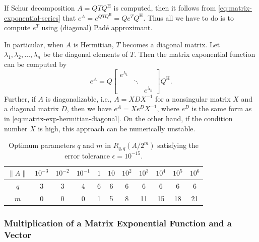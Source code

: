 {If Schur decomposition $A=QTQ^{\mathrm H}$ is computed, then it follows from \eqref{eq:matrix-exponential-series} that $e^A=e^{QTQ^{\mathrm H}}=Qe^TQ^{\mathrm H}$. Thus all we have to do is to compute $e^T$ using (diagonal) Padé approximant.}

{In particular, when $A$ is Hermitian, $T$ becomes a diagonal matrix. Let $\lambda_1,\lambda_2,\ldots,\lambda_n$ be the diagonal elements of $T$. Then the matrix exponential function can be computed by}
\begin{equation}\label{eq:matrix-exp-hermitian-diagonal}e^A=Q\begin{bmatrix}e^{\lambda_1}&&\\&\ddots&\\&&e^{\lambda_n}\end{bmatrix}Q^{\mathrm H}.\end{equation}
{Further, if $A$ is diagonalizable, i.e., $A=XDX^{-1}$ for a nonsingular matrix $X$ and a diagonal matrix $D$, then we have $e^A=Xe^DX^{-1}$, where $e^D$ is the same form as in \eqref{eq:matrix-exp-hermitian-diagonal}. On the other hand, if the condition number $X$ is high, this approach can be numerically unstable.}

\begin{table}[H]\centering
\caption{{Optimum parameters $q$ and $m$ in $R_{q,q}(A/2^m)$ satisfying the error tolerance $\epsilon=10^{-15}$.}}\label{tab:matrix-exp-pade-parameters}
\begin{tabular}{c|cccccccccc}\hline
$\|A\|$&$10^{-3}$&$10^{-2}$&$10^{-1}$&$1$&$10$&$10^2$&$10^3$&$10^4$&$10^5$&$10^6$\\\hline
$q$&3&3&4&6&6&6&6&6&6&6\\
$m$&0&0&0&1&5&8&11&15&18&21\\\hline
\end{tabular}\end{table}

\subsubsection{{Multiplication of a Matrix Exponential Function and a Vector}}\label{subsec:matrix-exponential-vector}

